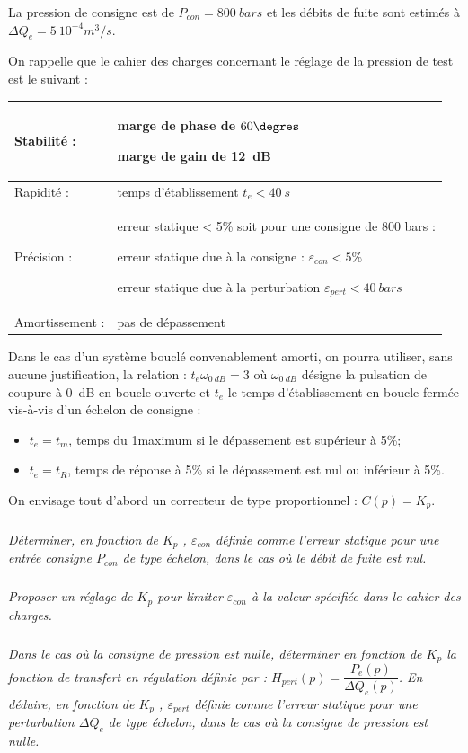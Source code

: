 \documentclass[10pt,fleqn]{article} %
\begin{document}
La pression de consigne est de $P_{con} = \SI{800}{bars}$ et les débits de fuite sont estimés à $\Delta Q_e = \SI{5}{10^{-4} m^3/s}$.

On rappelle que le cahier des charges concernant le réglage de la pression de test est le suivant :
\begin{center}
\begin{tabular}{|l|p{10cm}|}
\hline
Stabilité : & marge de phase de $60\degres$

 marge de gain de \SI{12}{dB} \\ \hline
Rapidité :	&temps d’établissement $t_e < \SI{40}{s}$ \\ \hline
Précision :&	erreur statique < 5\% soit pour une consigne de 800 bars :

erreur statique due à la consigne : $\varepsilon_{con} < 5\%$ 

erreur statique due à la perturbation $\varepsilon_{pert} < \SI{40}{bars}$ \\ \hline

Amortissement :&	pas de dépassement \\ \hline
\end{tabular}
\end{center}

Dans le cas d’un système bouclé convenablement amorti, on pourra utiliser, sans aucune justification, la relation : 	$t_e \omega_{\SI{0}{dB}}=3$ 
où $\omega_{\SI{0}{dB}}$ désigne la pulsation de coupure à \SI{0}{dB} en boucle ouverte et $t_e$ le temps d’établissement en boucle fermée vis-à-vis d’un échelon de consigne :
\begin{itemize}
\item $t_e = t_m$, temps du 1\ier maximum si le dépassement est supérieur à 5\%;
\item $t_e = t_R$, temps de réponse à 5\% si le dépassement est nul ou inférieur à 5\%.
\end{itemize}
On envisage tout d’abord un correcteur de type proportionnel : $C(p)=K_p$. 


\subparagraph{}
\textit{Déterminer, en fonction de $K_p$ , $\varepsilon_{con}$ définie comme l’erreur statique pour une entrée consigne $P_{con}$ de type échelon, dans le cas où le débit de fuite est nul.}

\subparagraph{}
\textit{Proposer un réglage de $K_p$ pour limiter $\varepsilon_{con}$ à la valeur spécifiée dans le  cahier des charges.}

\subparagraph{}
\textit{Dans le cas où la consigne de pression est nulle,  déterminer en fonction de $K_p$ la fonction de transfert en régulation définie par :
$H_{pert} (p)=\dfrac{P_e (p)}{\Delta Q_e (p)}$.
En déduire, en fonction de $K_p$ , $\varepsilon_{pert}$ définie comme l’erreur statique pour une perturbation $\Delta Q_e$ de type échelon, dans le cas où la consigne de pression est nulle.}
\end{document}
